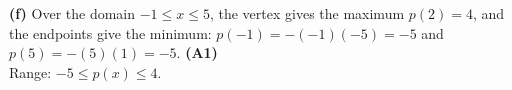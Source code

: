 \documentclass[12pt, twoside]{article}
\begin{document}
\begin{enumerate}[itemsep=0.2cm]
\vspace{0.3cm}
\textbf{(f)} Over the domain $-1 \leq x \leq 5$, the vertex gives the maximum
$p(2) = 4$, and the endpoints give the minimum: $p(-1) = -(-1)(-5) = -5$ and
$p(5) = -(5)(1) = -5$. \hfill \textbf{(A1)}\\[0.2cm]
\hspace*{1.5em}Range: $-5 \leq p(x) \leq 4$.

\end{enumerate}
\end{document}
